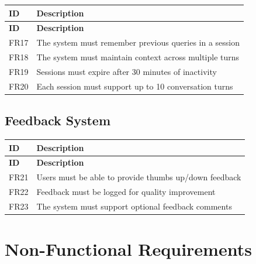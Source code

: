 \documentclass[12pt,a4paper]{book}
\numberwithin{table}{chapter}
\numberwithin{figure}{chapter}
\numberwithin{equation}{chapter}
\begin{document}
\begin{longtable}{|p{0.5in}|p{4in}|}
\hline
\textbf{ID} & \textbf{Description}\\
\hline
\endfirsthead
\hline
\textbf{ID} & \textbf{Description}\\
\hline
\endhead
\hline
FR17 & The system must remember previous queries in a session\\
\hline
FR18 & The system must maintain context across multiple turns\\
\hline
FR19 & Sessions must expire after 30 minutes of inactivity\\
\hline
FR20 & Each session must support up to 10 conversation turns\\
\hline
\end{longtable}

\subsection{Feedback System}

\begin{longtable}{|p{0.5in}|p{4in}|}
\hline
\textbf{ID} & \textbf{Description}\\
\hline
\endfirsthead
\hline
\textbf{ID} & \textbf{Description}\\
\hline
\endhead
\hline
FR21 & Users must be able to provide thumbs up/down feedback\\
\hline
FR22 & Feedback must be logged for quality improvement\\
\hline
FR23 & The system must support optional feedback comments\\
\hline
\end{longtable}

\section{Non-Functional Requirements}
\end{document}
